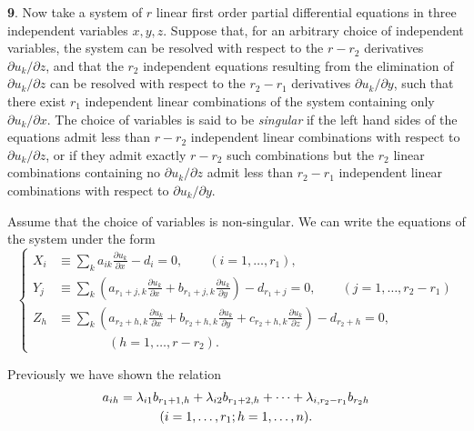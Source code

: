 \documentclass[leqno,11pt]{article}
\newcommand{\pd}{\partial}
\theoremstyle{shape1}
\theoremstyle{shape0}
\theoremstyle{shape2}
\theoremstyle{definition}
\begin{document}
\textbf{9}. Now take a system of $r$ linear first order partial differential equations in three independent variables $x,y,z$. Suppose that, for an arbitrary choice of independent variables, the system can be resolved with respect to the $r-r_{2}$ derivatives $\pd u_{k}/\pd z$, and that the $r_{2}$ independent equations resulting from the elimination of $\pd u_{k}/\pd z$ can be resolved with respect to the $r_{2}-r_{1}$ derivatives $\pd u_{k}/\pd y$, such that there exist $r_{1}$ independent linear combinations of the system containing only $\pd u_{k}/\pd x$. The choice of variables is said to be \emph{singular} if the left hand sides of the equations admit less than $r-r_{2}$ independent linear combinations with respect to $\pd u_{k}/\pd z$, or if they admit exactly $r-r_{2}$ such combinations but the $r_{2}$ linear combinations containing no $\pd u_{k}/\pd z$ admit less than $r_{2}-r_{1}$ independent linear combinations with respect to $\pd u_{k}/\pd y$.

Assume that the choice of variables is non-singular. We can write the equations of the system under the form
\begin{equation}
  \label{eq:5}
  \left\{
    \begin{aligned}
      X_{i}&\equiv\sum_{k}a_{ik}\frac{\pd u_{k}}{\pd x}-d_{i}=0,\qquad(i=1,\dots,r_{1}),\\
      Y_{j}&\equiv\sum_{k}\left(a_{r_{1}+j,k}\frac{\pd u_{k}}{\pd x}+b_{r_{1}+j,k}\frac{\pd u_{k}}{\pd y}\right)-d_{r_{1}+j}=0,\qquad(j=1,\dots,r_{2}-r_{1})\\
      Z_{h}&\equiv\sum_{k}\left(a_{r_{2}+h,k}\frac{\pd u_{k}}{\pd x}+b_{r_{2}+h,k}\frac{\pd u_{k}}{\pd y}+c_{r_{2}+h,k}\frac{\pd u_{k}}{\pd z}\right)-d_{r_{2}+h}=0,\\
      &\qquad\qquad(h=1,\dots,r-r_{2}).
    \end{aligned}
  \right.
\end{equation}

Previously we have shown the relation
\begin{gather}
  \label{eq:6}
  a_{ih}=\lambda_{i1}b_{r_{1}+1,h}+\lambda_{i2}b_{r_{1}+2,h}+\dots+\lambda_{i,r_{2}-r_{1}}b_{r_{2}h}\\
  (i=1,\dots,r_{1};h=1,\dots,n).\notag
\end{gather}
\end{document}
